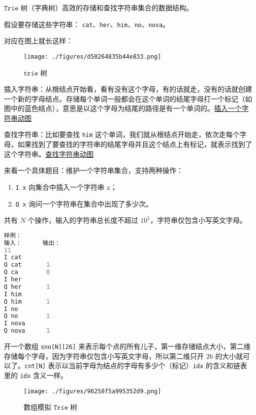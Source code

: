 
$\mathtt{Trie}$ 树（字典树）高效的存储和查找字符串集合的数据结构。

假设要存储这些字符串：
\verb|cat|、\verb|her|、\verb|him|、\verb|no|、\verb|nova|。

对应在图上就长这样：\begin{figure}[ht]
\centering
\texttt{[image: ./figures/d50264835b44e833.png]}
\caption{$\mathtt{trie}$ 树} \label{fig_trie_1}
\end{figure}

插入字符串：从根结点开始看，看有没有这个字母，有的话就走，没有的话就创建一个新的字母结点。存储每个单词一般都会在这个单词的结尾字母打一个标记（如图中的蓝色结点），意思是以这个字母为结尾的路径是有一个单词的。\href{https://pic2.zhimg.com/v2-cb9b476f3856b7ae68a00af6911c07a9_b.gif}{插入一个字符串动图}

查找字符串：比如要查找 \verb|him| 这个单词，我们就从根结点开始走，依次走每个字母，如果找到了要查找的字符串的结尾字母并且这个结点上有标记，就表示找到了这个字符串。\href{https://pic2.zhimg.com/v2-98c24afcfc74582fdc54c7381d29d639_b.gif}{查找字符串动图}

来看一个具体题目：维护一个字符串集合，支持两种操作：

\begin{enumerate}
\item \verb|I x| 向集合中插入一个字符串 x；
\item \verb|Q x| 询问一个字符串在集合中出现了多少次。
\end{enumerate}
共有 $N$ 个操作，输入的字符串总长度不超过 $10^5$，字符串仅包含小写英文字母。

\begin{lstlisting}[language=cpp]
样例：
输入：      输出：
11
I cat       
Q cat       1
Q ca        0
I her
Q her       1
I him
Q him       1
I no 
Q no        1
I nova
Q nova      1
\end{lstlisting}

开一个数组 \verb|sno[N][26]| 来表示每个点的所有儿子，第一维存储结点大小，第二维存储每个字母，因为字符串仅包含小写英文字母，所以第二维只开 $26$ 的大小就可以了。\verb|cnt[N]| 表示以当前字母为结点的字母有多少个（标记）\verb|idx| 的含义和链表里的 \verb|idx| 含义一样。

\begin{figure}[ht]
\centering
\texttt{[image: ./figures/96258f5a995352d9.png]}
\caption{数组模拟 $\mathtt{Trie}$ 树} \label{fig_trie_2}
\end{figure}

